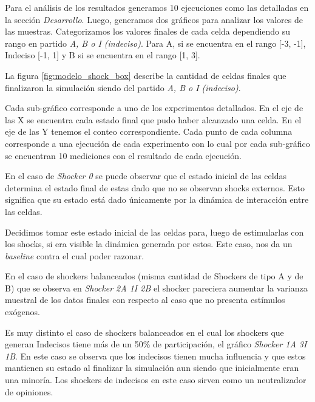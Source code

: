 Para el análisis de los resultados generamos 10 ejecuciones como las detalladas
en la sección \textit{Desarrollo}.
Luego, generamos dos gráficos para analizar los valores de las muestras.
Categorizamos los valores finales de cada celda dependiendo su rango en partido
\textit{A, B o I (indeciso)}. Para A, si se encuentra en el rango [-3, -1], Indeciso [-1, 1]  y B si se encuentra en el rango [1, 3].

La figura \ref{fig:modelo_shock_box} describe la cantidad de celdas finales que
finalizaron la simulación siendo del partido \textit{A, B o I (indeciso)}.

Cada sub-gráfico corresponde a uno de los experimentos detallados. En el eje de
las X se encuentra cada estado final que pudo haber alcanzado una celda. En el
eje de las Y tenemos el conteo correspondiente.  Cada punto de cada columna
corresponde a una ejecución de cada experimento con lo cual por cada
sub-gráfico se encuentran 10 mediciones con el resultado de cada ejecución.


En el caso de \textit{Shocker 0} se puede observar que el estado inicial de las
celdas determina el estado final de estas dado que no se observan shocks
externos. Esto significa que su estado está dado únicamente por la dinámica de
interacción entre las celdas.

Decidimos tomar este estado inicial de las celdas para, luego de estimularlas
con los shocks, si era visible la dinámica generada por estos.
Este caso, nos da un \textit{baseline} contra el cual poder razonar.

En el caso de shockers balanceados (misma cantidad de Shockers de tipo A  y de
B) que se observa en \textit{Shocker 2A 1I 2B} el shocker
pareciera aumentar la varianza muestral de los datos finales con respecto al
caso que no presenta estímulos exógenos.

Es muy distinto el caso de shockers balanceados en el cual los shockers que generan
Indecisos tiene más de un 50\% de participación, el gráfico \textit{Shocker 1A 3I 1B}.
En este caso se observa que los indecisos tienen mucha influencia y que estos
mantienen su estado al finalizar la simulación aun siendo que inicialmente eran una minoría.
Los shockers de indecisos en este caso sirven como un neutralizador de opiniones.



